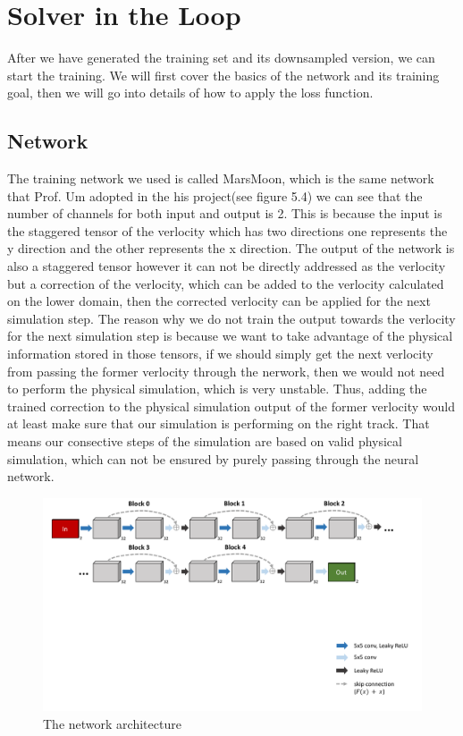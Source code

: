 \documentclass[a4paper,12pt,twoside]{report}
\begin{document}
\section{Solver in the Loop}
After we have generated the training set and its downsampled version, we can start the training. We will first cover the basics of the network and its training goal, then we will go into details of how to apply the loss function.
\subsection{Network}
The training network we used is called MarsMoon, which is the same network that Prof. Um adopted in the his project(see figure 5.4) we can see that the number of channels for both input and output is 2. This is because the input is the staggered tensor of the verlocity which has two directions one represents the y direction and the other represents the x direction. The output of the network is also a staggered tensor however it can not be directly addressed as the verlocity but a correction of the verlocity, which can be added to the verlocity calculated on the lower domain, then the corrected verlocity can be applied for the next simulation step. The reason why we do not train the output towards the verlocity for the next simulation step is because we want to take advantage of the physical information stored in those tensors, if we should simply get the next verlocity from passing the former verlocity through the nerwork, then we would not need to perform the physical simulation, which is very unstable. Thus, adding the trained correction to the physical simulation output of the former verlocity would at least make sure that our simulation is performing on the right track. That means our consective steps of the simulation are based on valid physical simulation, which can not be ensured by purely passing through the neural network.
\begin{figure}
\centering
\includegraphics[width=1.0\textwidth]{marsmoon.pdf}
\caption{The network architecture\cite{um2020sol}}
\end{figure}
\end{document}
